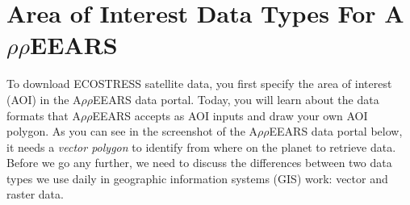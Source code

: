 \documentclass[oneside,a4paper,11pt,explicit]{book}
\begin{document}
	\noindent{}
	
	\vspace{1 em}

	\section{Area of Interest Data Types For A$\rho\rho$EEARS}

To download ECOSTRESS satellite data, you first specify the area of interest (AOI) in the A$\rho\rho$EEARS data portal. Today, you will learn about the data formats that A$\rho\rho$EEARS accepts as AOI inputs and draw your own AOI polygon. As you can see in the screenshot of the A$\rho\rho$EEARS data portal below, it needs a \textit{vector polygon} to identify from where on the planet to retrieve data. Before we go any further, we need to discuss the differences between two data types we use daily in geographic information systems (GIS) work: vector and raster data.
\end{document}
